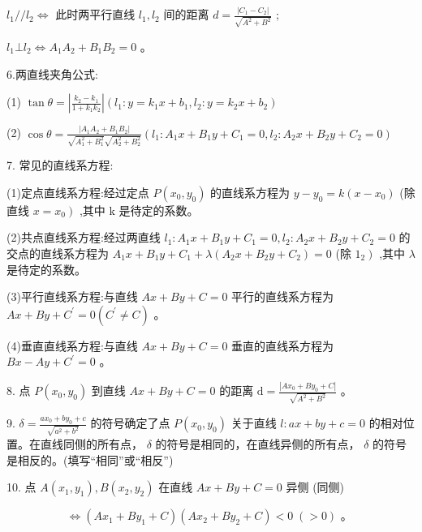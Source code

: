 \documentclass[10pt]{article}
\begin{document}
\({l}_{1}//{l}_{2} \Leftrightarrow\) 此时两平行直线 \({l}_{1},{l}_{2}\) 间的距离 \(d = \frac{\left| {C}_{1} - {C}_{2}\right| }{\sqrt{{A}^{2} + {B}^{2}}}\) ;

\({l}_{1} \bot  {l}_{2} \Leftrightarrow  {A}_{1}{A}_{2} + {B}_{1}{B}_{2} = 0\) 。

6.两直线夹角公式:

(1) \(\tan \theta  = \left| \frac{{k}_{2} - {k}_{1}}{1 + {k}_{1}{k}_{2}}\right| \left( {{l}_{1} : y = {k}_{1}x + {b}_{1},{l}_{2} : y = {k}_{2}x + {b}_{2}}\right)\)

(2) \(\cos \theta  = \frac{\left| {A}_{1}{A}_{2} + {B}_{1}{B}_{2}\right| }{\sqrt{{A}_{1}^{2} + {B}_{1}^{2}}\sqrt{{A}_{2}^{2} + {B}_{2}^{2}}}\left( {{l}_{1} : {A}_{1}x + {B}_{1}y + {C}_{1} = 0,{l}_{2} : {A}_{2}x + {B}_{2}y + {C}_{2} = 0}\right)\)

7. 常见的直线系方程:

(1)定点直线系方程:经过定点 \(P\left( {{x}_{0},{y}_{0}}\right)\) 的直线系方程为 \(y - {y}_{0} = k\left( {x - {x}_{0}}\right)\) (除直线 \(\left. {x = {x}_{0}}\right)\) ,其中 \(\mathrm{k}\) 是待定的系数。

(2)共点直线系方程:经过两直线 \({l}_{1} : {A}_{1}x + {B}_{1}y + {C}_{1} = 0,{l}_{2} : {A}_{2}x + {B}_{2}y + {C}_{2} = 0\) 的交点的直线系方程为 \({A}_{1}x + {B}_{1}y + {C}_{1} + \lambda \left( {{A}_{2}x + {B}_{2}y + {C}_{2}}\right)  = 0\) (除 \(\left. {1}_{2}\right)\) ,其中 \(\lambda\) 是待定的系数。

(3)平行直线系方程:与直线 \({Ax} + {By} + C = 0\) 平行的直线系方程为 \({Ax} + {By} + {C}^{\prime } = 0\left( {{C}^{\prime } \neq  C}\right)\) 。

(4)垂直直线系方程:与直线 \({Ax} + {By} + C = 0\) 垂直的直线系方程为 \({Bx} - {Ay} + {C}^{\prime } = 0\) 。

8. 点 \(P\left( {{x}_{0},{y}_{0}}\right)\) 到直线 \({Ax} + {By} + C = 0\) 的距离 \(\mathrm{d} = \frac{\left| A{x}_{0} + B{y}_{0} + C\right| }{\sqrt{{A}^{2} + {B}^{2}}}\) 。

9. \(\delta  = \frac{a{x}_{0} + b{y}_{0} + c}{\sqrt{{a}^{2} + {b}^{2}}}\) 的符号确定了点 \(P\left( {{x}_{0},{y}_{0}}\right)\) 关于直线 \(l : {ax} + {by} + c = 0\) 的相对位置。在直线同侧的所有点， \(\delta\) 的符号是相同的，在直线异侧的所有点， \(\delta\) 的符号是相反的。(填写“相同”或“相反”)

10. 点 \(A\left( {{x}_{1},{y}_{1}}\right) ,B\left( {{x}_{2},{y}_{2}}\right)\) 在直线 \({Ax} + {By} + C = 0\) 异侧 (同侧)

\[
\Leftrightarrow  \left( {A{x}_{1} + B{y}_{1} + C}\right) \left( {A{x}_{2} + B{y}_{2} + C}\right)  < 0\;\left( { > 0}\right) \text{ 。 }
\]
\end{document}
